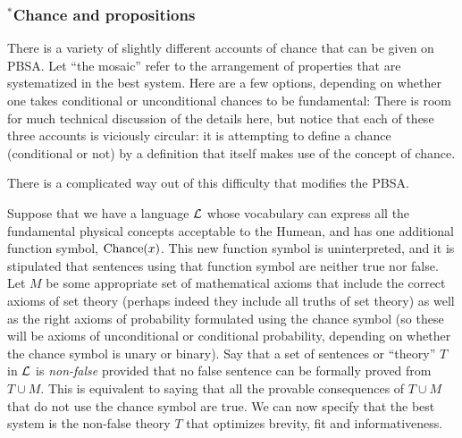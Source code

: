 \subsubsection{$^*$Chance and propositions}
There is a variety of slightly different accounts of chance that can be given on PBSA. Let ``the mosaic'' refer to the arrangement of
properties that are systematized in the best system. Here are a few options, depending on whether one takes conditional or unconditional
chances to be fundamental:
There is room for much technical discussion of the details here, but notice that each of these three accounts is viciously circular: it
is attempting to define a chance (conditional or not) by a definition that itself makes use of the concept of chance.

There is a complicated way out of this difficulty that modifies the PBSA.

Suppose that we have a language $\mathcal L$ whose vocabulary can express all the fundamental physical concepts acceptable to 
the Humean, and has one additional function symbol, $\operatorname{Chance}(x)$. This new function symbol is uninterpreted, and  it is stipulated that sentences using that function symbol are 
neither true nor false. Let $M$ be some appropriate set of mathematical axioms that include the correct axioms of set theory (perhaps indeed
they include all truths of set theory) as well as the 
right axioms of probability formulated using the chance symbol (so these will be axioms of unconditional or conditional probability, depending 
on whether the chance symbol is unary or binary).  Say that a set of sentences or ``theory'' $T$ in $\mathcal L$ is \textit{non-false} provided that 
no false sentence can be formally proved from $T\cup M$. This is equivalent to saying that all the provable consequences of $T\cup M$ that do 
not use the chance symbol are true. We can now specify that the best system is the non-false theory $T$ that optimizes brevity, fit and 
informativeness. 

